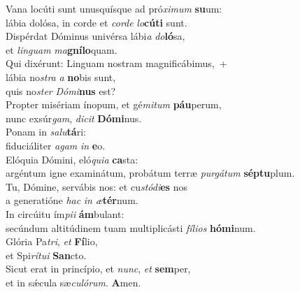 \evenverse Vana locúti sunt unusquísque ad pró\textit{xi}\textit{mum} \textbf{su}um:~\*\\
\evenverse lábia dolósa, in corde et \textit{cor}\textit{de} \textit{lo}\textbf{cú}\textbf{ti} sunt.\\
\oddverse Dispérdat Dóminus univérsa lábi\textit{a} \textit{do}\textbf{ló}sa,~\*\\
\oddverse et \textit{lin}\textit{guam} \textit{ma}\textbf{gní}\textbf{lo}quam.\\
\evenverse Qui dixérunt: Linguam nostram magnificábimus,~+\\
\evenverse  lábia no\textit{stra} \textit{a} \textbf{no}bis sunt,~\*\\
\evenverse quis no\textit{ster} \textit{Dó}\textit{mi}\textbf{nus} est?\\
\oddverse Propter misériam ínopum, et gé\textit{mi}\textit{tum} \textbf{páu}perum,~\*\\
\oddverse nunc exsúr\textit{gam}, \textit{di}\textit{cit} \textbf{Dó}\textbf{mi}nus.\\
\evenverse Ponam in \textit{sa}\textit{lu}\textbf{tá}ri:~\*\\
\evenverse fiduciáliter \textit{a}\textit{gam} \textit{in} \textbf{e}o.\\
\oddverse Elóquia Dómini, eló\textit{qui}\textit{a} \textbf{ca}sta:~\*\\
\oddverse argéntum igne examinátum, probátum terræ \textit{pur}\textit{gá}\textit{tum} \textbf{sép}\textbf{tu}plum.\\
\evenverse Tu, Dómine, servábis nos: et cu\textit{stó}\textit{di}\textbf{es} nos~\*\\
\evenverse a generatióne \textit{hac} \textit{in} \textit{æ}\textbf{tér}num.\\
\oddverse In circúitu ím\textit{pi}\textit{i} \textbf{ám}bulant:~\*\\
\oddverse secúndum altitúdinem tuam multiplicásti \textit{fí}\textit{li}\textit{os} \textbf{hó}\textbf{mi}num.\\
\evenverse Glória Pa\textit{tri}, \textit{et} \textbf{Fí}lio,~\*\\
\evenverse et Spi\textit{rí}\textit{tu}\textit{i} \textbf{San}cto.\\
\oddverse Sicut erat in princípio, et \textit{nunc}, \textit{et} \textbf{sem}per,~\*\\
\oddverse et in sǽcula sæ\textit{cu}\textit{ló}\textit{rum}. \textbf{A}men.\\
